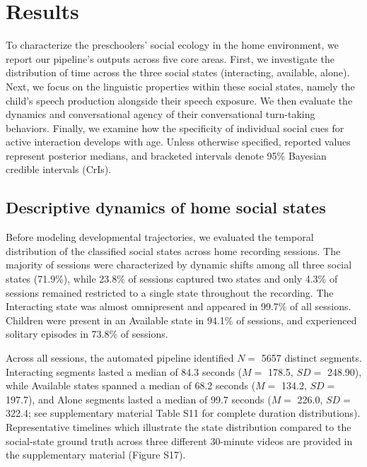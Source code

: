 \documentclass[
  english,
  12pt,
  man,floatsintext]{apa6}
\begin{document}
\section{Results}\label{results}

To characterize the preschoolers' social ecology in the home environment, we report our pipeline's outputs across five core areas. First, we investigate the distribution of time across the three social states (interacting, available, alone). Next, we focus on the linguistic properties within these social states, namely the child's speech production alongside their speech exposure. We then evaluate the dynamics and conversational agency of their conversational turn-taking behaviors. Finally, we examine how the specificity of individual social cues for active interaction develops with age. Unless otherwise specified, reported values represent posterior medians, and bracketed intervals denote 95\% Bayesian credible intervals (CrIs).

\subsection{Descriptive dynamics of home social states}\label{descriptive-dynamics-of-home-social-states}

Before modeling developmental trajectories, we evaluated the temporal distribution of the classified social states across home recording sessions. The majority of sessions were characterized by dynamic shifts among all three social states (71.9\%), while 23.8\% of sessions captured two states and only 4.3\% of sessions remained restricted to a single state throughout the recording. The Interacting state was almost omnipresent and appeared in 99.7\% of all sessions. Children were present in an Available state in 94.1\% of sessions, and experienced solitary episodes in 73.8\% of sessions.

Across all sessions, the automated pipeline identified \(N=\) 5657 distinct segments. Interacting segments lasted a median of 84.3 seconds (\(M=\) 178.5, \(SD=\) 248.90), while Available states spanned a median of 68.2 seconds (\(M=\) 134.2, \(SD=\) 197.7), and Alone segments lasted a median of 99.7 seconds (\(M=\) 226.0, \(SD=\) 322.4; see supplementary material Table S11 for complete duration distributions). Representative timelines which illustrate the state distribution compared to the social-state ground truth across three different 30-minute videos are provided in the supplementary material (Figure S17).
\end{document}
